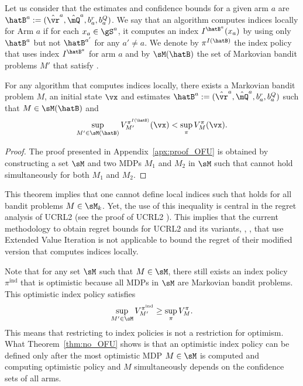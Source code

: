 Let us consider that the estimates and confidence bounds for a given arm $a$ are $\hatB^a:=(\hat{\vr}^a,\hat{\mQ}^a,b^r_a,b^{Q}_a)$. We say that an algorithm computes indices locally for  Arm $a$ if for each $x_a\in\gS^a$, it computes an index $I^{\hatB^a}(x_a)$ by using only $\hatB^a$ but not $\hatB^{a'}$ for any $a'\ne a$. We denote by $\pi^{I(\hatB)}$ the index policy that uses index $I^{\hatB^a}$ for arm $a$ and by $\sM(\hatB)$ the set of Markovian bandit problems $M'$ that satisfy .
\begin{thm}
    \label{thm:no_OFU}
    For any algorithm that computes indices locally, there exists a Markovian bandit problem $M$, an initial state $\vx$ and estimates $\hatB^a:=(\hat{\vr}^a,\hat{\mQ}^a,b^r_a, b^Q_a)$ such that $M\in\sM(\hatB)$ and
    \begin{align*}
        \sup_{M'\in\sM(\hatB)}V^{\pi^{I(\hatB)}}_{M'}(\vx) < \sup_\pi V^{\pi}_{M}(\vx).
    \end{align*}
\end{thm}
\begin{proof}
    The proof presented in Appendix~\ref{apx:proof_OFU} is obtained by constructing a set $\sM$ and two MDPs $M_1$ and $M_2$ in $\sM$ such that  cannot hold simultaneously for both $M_1$ and $M_2$. 
\end{proof}
This theorem implies that one cannot define local indices such that  holds for all bandit problems $M\in\sM_k$. Yet, the use of this inequality is central in the regret analysis of UCRL2 (see the proof of UCRL2 \cite{jaksch2010near}). This implies that the current methodology to obtain regret bounds for UCRL2 and its variants, \eg, \cite{bourel2020tightening,fruit2018efficient,talebi2018variance,filippi2010optimism}, that use Extended Value Iteration is not applicable to bound the regret of their modified version that computes indices locally. 

Note that for any set $\sM$ such that $M \in \sM$, there still exists an index policy $\pi^{\mathrm{ind}}$ that is optimistic because all MDPs in $\sM$ are Markovian bandit problems. This optimistic index policy satisfies
\begin{align*}
  \sup_{M'\in\sM}V^{\pi^{\mathrm{ind}}}_{M'} \ge \sup_\pi V^{\pi}_{M}.
\end{align*}
This means that restricting to index policies is not a restriction for optimism. What Theorem~\ref{thm:no_OFU} shows is that an optimistic index policy can be defined only after the most optimistic MDP $M\in\sM$ is computed and computing optimistic policy and $M$ simultaneously depends on the confidence sets of all arms.

